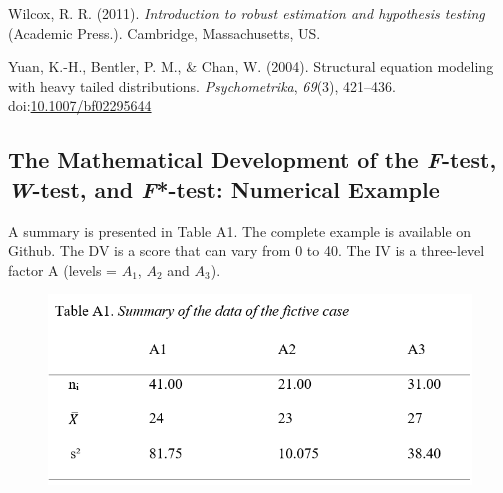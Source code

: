 \documentclass[man,floatsintext]{apa6}
\begin{document}
\leavevmode\hypertarget{ref-Wilcox_2011}{}%
Wilcox, R. R. (2011). \emph{Introduction to robust estimation and hypothesis testing} (Academic Press.). Cambridge, Massachusetts, US.

\leavevmode\hypertarget{ref-Yuan_et_al_2004}{}%
Yuan, K.-H., Bentler, P. M., \& Chan, W. (2004). Structural equation modeling with heavy tailed distributions. \emph{Psychometrika}, \emph{69}(3), 421--436. doi:\href{https://doi.org/10.1007/bf02295644}{10.1007/bf02295644}

\clearpage
\makeatletter
\efloat@restorefloats
\makeatother


\begin{appendix}
\section{}
\setlength{\parindent}{0.0in}
\setlength{\leftskip}{0.0in}

\hypertarget{the-mathematical-development-of-the-f-test-w-test-and-f-test-numerical-example}{%
\subsection{\texorpdfstring{The Mathematical Development of the
\emph{F}-test, \emph{W}-test, and \emph{F}*-test: Numerical
Example}{The Mathematical Development of the F-test, W-test, and F*-test: Numerical Example}}\label{the-mathematical-development-of-the-f-test-w-test-and-f-test-numerical-example}}

A summary is presented in Table A1. The complete example is available on
Github. The DV is a score that can vary from 0 to 40. The IV is a
three-level factor A (levels = \(A_1\), \(A_2\) and \(A_3\)).

\begin{figure}
\includegraphics[width=1\linewidth]{Rmarkdown folder/Rmarkdown inputs/TableA1} \end{figure}


\end{appendix}
\end{document}
